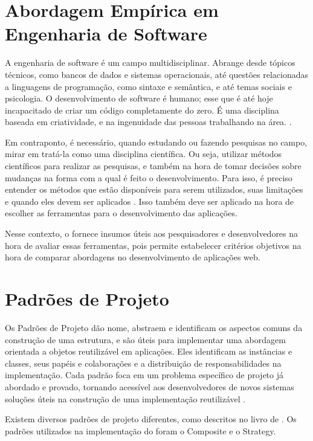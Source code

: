 \documentclass[12pt]{tcc}
\begin{document}
		\section{Abordagem Empírica em Engenharia de Software}
		\label{cap:engenharia-de-software-empirica}

		A engenharia de software é um campo multidisciplinar. Abrange desde tópicos técnicos, como bancos de dados e sistemas operacionais, até questões relacionadas a linguagens de programação, como sintaxe e semântica, e até temas sociais e  psicologia. O desenvolvimento de software é humano; esse que é até hoje incapacitado de criar um código completamente do zero. É uma disciplina baseada em criatividade, e na ingenuidade das pessoas trabalhando na área. \citep{wohlin2012experimentation}.

		Em contraponto, é necessário, quando estudando ou fazendo pesquisas no campo, mirar em tratá-la como uma disciplina científica. Ou seja, utilizar métodos científicos para realizar as pesquisas, e também na hora de tomar decisões sobre mudanças na forma com a qual é feito o desenvolvimento. Para isso, é preciso entender os métodos que estão disponíveis para serem utilizados, suas limitações e quando eles devem ser aplicados \citep{wohlin2012experimentation}. Isso também deve ser aplicado na hora de escolher as ferramentas para o desenvolvimento das aplicações.

		Nesse contexto, o  fornece insumos úteis aos pesquisadores e desenvolvedores na hora de avaliar essas ferramentas, pois permite estabelecer critérios objetivos na hora de comparar abordagens no desenvolvimento de aplicações web.

		\section{Padrões de Projeto}
		\label{cap:padroes-de-projeto}

		Os Padrões de Projeto dão nome, abstraem e identificam os aspectos comuns da construção de uma estrutura, e são úteis para implementar uma abordagem orientada a objetos reutilizável em aplicações. Eles identificam as instâncias e classes, seus papéis e colaborações e a distribuição de responsabilidades na implementação. Cada padrão foca em um problema específico de projeto já abordado e provado, tornando acessível aos desenvolvedores de novos sistemas soluções úteis na construção de uma implementação reutilizável \citep{gamma1994design}.
		
		Existem diversos padrões de projeto diferentes, como descritos no livro de \cite{gamma1994design}. Os padrões utilizados na implementação do  foram o Composite e o Strategy.
\end{document}
